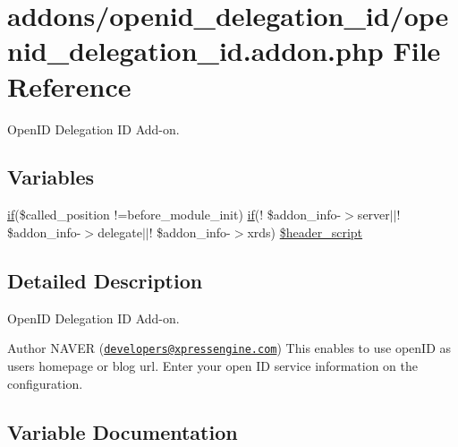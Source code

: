 \hypertarget{openid__delegation__id_8addon_8php}{}\section{addons/openid\+\_\+delegation\+\_\+id/openid\+\_\+delegation\+\_\+id.addon.\+php File Reference}
\label{openid__delegation__id_8addon_8php}


Open\+ID Delegation ID Add-\/on.  


\subsection*{Variables}
\begin{DoxyCompactItemize}
\item 
\hyperlink{config_8inc_8php_a73b98c0274e28635a594091f9ca43cb4}{if}(\$called\+\_\+position !=\textquotesingle{}before\+\_\+module\+\_\+init\textquotesingle{}) \hyperlink{config_8inc_8php_a73b98c0274e28635a594091f9ca43cb4}{if}(! \$addon\+\_\+info-\/$>$server$\vert$$\vert$! \$addon\+\_\+info-\/$>$delegate$\vert$$\vert$! \$addon\+\_\+info-\/$>$xrds) \hyperlink{openid__delegation__id_8addon_8php_accbe833cdba0e2efb425bd7ea757bb4b}{\$header\+\_\+script}
\end{DoxyCompactItemize}


\subsection{Detailed Description}
Open\+ID Delegation ID Add-\/on. 

\begin{DoxyAuthor}{Author}
N\+A\+V\+ER (\href{mailto:developers@xpressengine.com}{\tt developers@xpressengine.\+com}) This enables to use open\+ID as user\textquotesingle{}s homepage or blog url. Enter your open ID service information on the configuration. 
\end{DoxyAuthor}


\subsection{Variable Documentation}
\mbox{\label{openid__delegation__id_8addon_8php_accbe833cdba0e2efb425bd7ea757bb4b}} 
